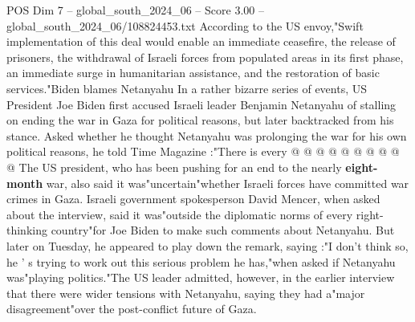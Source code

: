 \begin{textsample}{POS Dim 7 – global\_south\_2024\_06 – Score 3.00 – global\_south\_2024\_06/108824453.txt}
According to the US envoy,"Swift implementation of this deal would enable an immediate ceasefire, the release of prisoners, the withdrawal of Israeli forces from populated areas in its first phase, an immediate surge in humanitarian assistance, and the restoration of basic services."Biden blames Netanyahu In a rather bizarre series of events, US President Joe Biden first accused Israeli leader Benjamin Netanyahu of stalling on ending the war in Gaza for political reasons, but later backtracked from his stance.
Asked whether he thought Netanyahu was prolonging the war for his own political reasons, he told Time Magazine :"There is every @ @ @ @ @ @ @ @ @ @ The US president, who has been pushing for an end to the nearly \textbf{eight-month} war, also said it was"uncertain"whether Israeli forces have committed war crimes in Gaza.
Israeli government spokesperson David Mencer, when asked about the interview, said it was"outside the diplomatic norms of every right-thinking country"for Joe Biden to make such comments about Netanyahu.
But later on Tuesday, he appeared to play down the remark, saying :"I don't think so, he ' s trying to work out this serious problem he has,"when asked if Netanyahu was"playing politics."The US leader admitted, however, in the earlier interview that there were wider tensions with Netanyahu, saying they had a"major disagreement"over the post-conflict future of Gaza.

\end{textsample}
